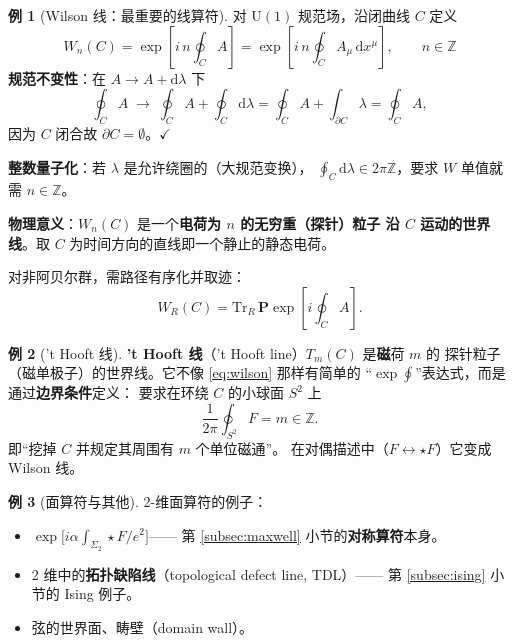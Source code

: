 \documentclass[UTF8,a4paper,11pt]{ctexart}
\theoremstyle{plain}
\theoremstyle{definition}
\newtheorem{example}{例}[section]
\theoremstyle{remark}
\newcommand{\ext}{\mathrm{d}}          %
\newcommand{\hs}{\star}                %
\newcommand{\Tr}{\mathrm{Tr}}
\newcommand{\Pexp}{\mathbf{P}\exp}
\newcommand{\ZZ}{\mathbb{Z}}
\newcommand{\Uone}{\mathrm{U}(1)}
\newcommand{\Ssurf}{\Sigma}
\newcommand{\en}[1]{\textsf{#1}}       %
\begin{document}
\begin{example}[Wilson 线：最重要的线算符]
\label{ex:wilson}
对 $\Uone$ 规范场，沿闭曲线 $C$ 定义
\begin{equation}
  \boxed{\ W_n(C)=\exp\!\left[i\,n\oint_C A\right]
  =\exp\!\left[i\,n\oint_C A_\mu\,\ext x^\mu\right],
  \qquad n\in\ZZ\ }
  \label{eq:wilson}
\end{equation}
\textbf{规范不变性}：在 $A\to A+\ext\lambda$ 下
\begin{equation}
  \oint_C A\;\longrightarrow\;\oint_C A+\oint_C \ext\lambda
  =\oint_C A+\int_{\partial C}\lambda
  =\oint_C A ,
\end{equation}
因为 $C$ 闭合故 $\partial C=\emptyset$。$\checkmark$

\textbf{整数量子化}：若 $\lambda$ 是允许绕圈的（大规范变换），
$\oint_C \ext\lambda\in2\pi\ZZ$，要求 $W$ 单值就需 $n\in\ZZ$。

\textbf{物理意义}：$W_n(C)$ 是一个\textbf{电荷为 $n$ 的无穷重（探针）粒子
沿 $C$ 运动的世界线}。取 $C$ 为时间方向的直线即一个静止的静态电荷。

对非阿贝尔群，需路径有序化并取迹：
\begin{equation}
  W_R(C)=\Tr_R\,\Pexp\!\left[i\oint_C A\right].
  \label{eq:wilsonNA}
\end{equation}
\end{example}

\begin{example}['t Hooft 线]
\label{ex:thooft}
\textbf{'t Hooft 线}（\en{'t Hooft line}）$T_m(C)$ 是\textbf{磁}荷 $m$ 的
探针粒子（磁单极子）的世界线。它不像 \eqref{eq:wilson} 那样有简单的
“$\exp\oint$”表达式，而是通过\textbf{边界条件}定义：
要求在环绕 $C$ 的小球面 $S^2$ 上
\begin{equation}
  \frac{1}{2\pi}\oint_{S^2}F=m\in\ZZ .
  \label{eq:thooftdef}
\end{equation}
即“挖掉 $C$ 并规定其周围有 $m$ 个单位磁通”。
在对偶描述中（$F\leftrightarrow\hs F$）它变成 Wilson 线。
\end{example}

\begin{example}[面算符与其他]
2-维面算符的例子：
\begin{itemize}
  \item $\exp\big[i\alpha\int_{\Ssurf_2}\hs F/e^2\big]$——
        第 \ref{subsec:maxwell} 小节的\textbf{对称算符}本身。
  \item 2 维中的\textbf{拓扑缺陷线}（\en{topological defect line}, TDL）——
        第 \ref{subsec:ising} 小节的 Ising 例子。
  \item 弦的世界面、畴壁（\en{domain wall}）。
\end{itemize}
\end{example}
\end{document}
